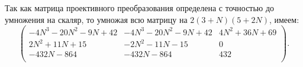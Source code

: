 \documentclass[a4paper,12pt]{article}
\theoremstyle{definition}
\begin{document}
    Так как матрица проективного преобразования определена с точностью до
    умножения на скаляр, то умножая всю матрицу на \(2 (3 + N) (5 + 2 N)\),
    имеем:
    \[
    \begin{pmatrix}
        -4 N^3 - 20 N^2 - 9 N + 42 & -4 N^3 - 20 N^2 - 9 N + 42 & 4 N^2 + 36 N + 69 \\
        2 N^2 + 11 N + 15 &  -2 N^2 - 11 N - 15 & 0 \\
        -432 N - 864 &  -432 N - 864 & 432 \\
    \end{pmatrix}
    .\] 
    
    
    
\end{document}
